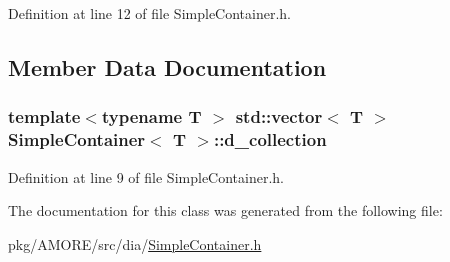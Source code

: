Definition at line 12 of file SimpleContainer.h.



\subsection{Member Data Documentation}
\hypertarget{class_simple_container_a0be5592282fc09b51a344d4083a7daf9}{
\subsubsection[{d\_\-collection}]{\setlength{\rightskip}{0pt plus 5cm}template$<$typename T $>$ std::vector$<$ T $>$ {\bf SimpleContainer}$<$ T $>$::{\bf d\_\-collection}}}
\label{class_simple_container_a0be5592282fc09b51a344d4083a7daf9}


Definition at line 9 of file SimpleContainer.h.



The documentation for this class was generated from the following file:\begin{DoxyCompactItemize}
\item 
pkg/AMORE/src/dia/\hyperlink{_simple_container_8h}{SimpleContainer.h}\end{DoxyCompactItemize}
